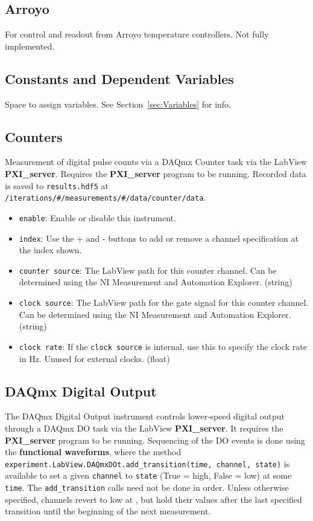 \documentclass[pdftex,11pt,letterpaper]{article}
\begin{document}
\subsection{Arroyo}

For control and readout from Arroyo temperature controllers.  Not fully implemented.

\subsection{Constants and Dependent Variables}

Space to assign variables.  See Section~\ref{sec:Variables} for info.

\subsection{Counters}

Measurement of digital pulse counts via a DAQmx Counter task via the LabView \textbf{PXI\_server}.  Requires the \textbf{PXI\_server} program to be running.  Recorded data is saved to \texttt{results.hdf5} at \texttt{/iterations/\#/measurements/\#/data/counter/data}.

\begin{itemize}
\item \texttt{enable}: Enable or disable this instrument.
\item \texttt{index}:  Use the + and - buttons to add or remove a channel specification at the index shown.
\item \texttt{counter source}:  The LabView path for this counter channel.  Can be determined using the NI Measurement and Automation Explorer. (string)
\item \texttt{clock source}:  The LabView path for the gate signal for this counter channel.  Can be determined using the NI Measurement and Automation Explorer. (string)
\item \texttt{clock rate}:  If the \texttt{clock source} is internal, use this to specify the clock rate in Hz.  Unused for external clocks. (float)
\end{itemize}

\subsection{DAQmx Digital Output}

The DAQmx Digital Output instrument controls lower-speed digital output through a DAQmx DO task via the LabView \textbf{PXI\_server}.  It requires the \textbf{PXI\_server} program to be running.  Sequencing of the DO events is done using the \textbf{functional waveforms}, where the method \texttt{experiment.LabView.DAQmxDOt.add\_transition(time, channel, state)} is available to set a given \texttt{channel} to \texttt{state} (True = high, False = low) at some \texttt{time}.  The \texttt{add\_transition} calls need not be done in order.  Unless otherwise specified, channels revert to low at , but hold their values after the last specified transition until the beginning of the next measurement.
\end{document}
